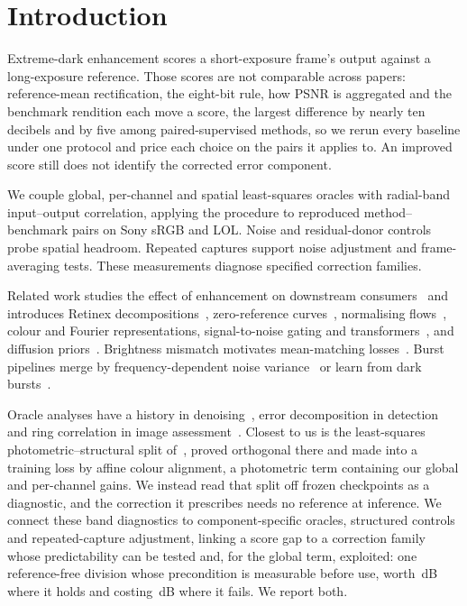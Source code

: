 \section{Introduction}
\label{sec:intro}

Extreme-dark enhancement scores a short-exposure frame's output against a long-exposure
reference. Those scores are not comparable across papers: reference-mean rectification, the eight-bit rule, how PSNR is aggregated and the benchmark rendition each move a score, the largest difference by nearly ten decibels and by five among paired-supervised methods, so we rerun every baseline under one protocol and price each choice on the pairs it applies to. An improved
score still does not identify the corrected error component.

We couple global, per-channel and spatial least-squares oracles with radial-band
input--output correlation, applying the procedure to \nCMPnAll{} reproduced
method--benchmark pairs on Sony sRGB and LOL. Noise and residual-donor controls probe spatial headroom. Repeated captures support noise adjustment and frame-averaging tests. These measurements diagnose specified correction families.

Related work studies the effect of enhancement on downstream
consumers~\cite{empirical2024,limeeval2024} and introduces Retinex
decompositions~\cite{kind2019,uretinex2022}, zero-reference
curves~\cite{zerodcepp2022}, normalising flows~\cite{llflow2022}, colour and Fourier
representations, signal-to-noise gating and
transformers~\cite{cidnet,cidnetplus,fecnet2022,fourllie2023,snrnet2022,llformer2023},
and diffusion priors~\cite{gsad2023,lightendiff2024}.
Brightness mismatch motivates mean-matching losses~\cite{gtmean2025}. Burst pipelines
merge by frequency-dependent noise variance~\cite{hdrplus2016} or learn from dark
bursts~\cite{karadeniz2021}.

Oracle analyses have a history in denoising~\cite{chatterjee2010,levin2011}, error decomposition in detection~\cite{hoiem2012} and ring correlation in image assessment~\cite{frc2022}. Closest to us is the least-squares photometric--structural split of~\cite{pal2026}, proved orthogonal there and made into a training loss by affine colour alignment, a photometric term containing our global and per-channel gains. We instead read that split off frozen checkpoints as a diagnostic, and the correction it prescribes needs no reference at inference. We connect these band diagnostics to component-specific oracles, structured controls and repeated-capture adjustment, linking a score gap to a correction family whose predictability can be tested and, for the global term, exploited: one reference-free division whose precondition is measurable before use, worth \nFRetgain{}\,dB where it holds and costing \nLOLRFloss{}\,dB where it fails. We report both.
